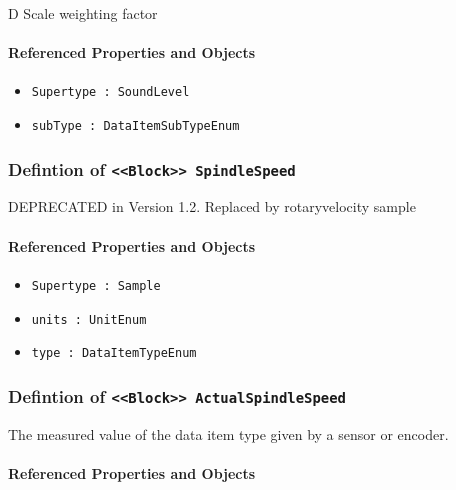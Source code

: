 \FloatBarrier

D Scale weighting factor

\FloatBarrier
\paragraph{Referenced Properties and Objects}

\begin{itemize}
\item \texttt{Supertype : SoundLevel}

\item \texttt{subType : DataItemSubTypeEnum}

\end{itemize}
\FloatBarrier
\subsubsection{Defintion of \texttt{<<Block>> SpindleSpeed}}
  \label{type:SpindleSpeed}

\FloatBarrier

DEPRECATED in Version 1.2.  Replaced by rotaryvelocity sample

\FloatBarrier
\paragraph{Referenced Properties and Objects}

\begin{itemize}
\item \texttt{Supertype : Sample}

\item \texttt{units : UnitEnum}

\item \texttt{type : DataItemTypeEnum}

\end{itemize}
\FloatBarrier
\subsubsection{Defintion of \texttt{<<Block>> ActualSpindleSpeed}}
  \label{type:ActualSpindleSpeed}

\FloatBarrier

The measured value of the data item type given by a sensor or encoder.

\FloatBarrier
\paragraph{Referenced Properties and Objects}

